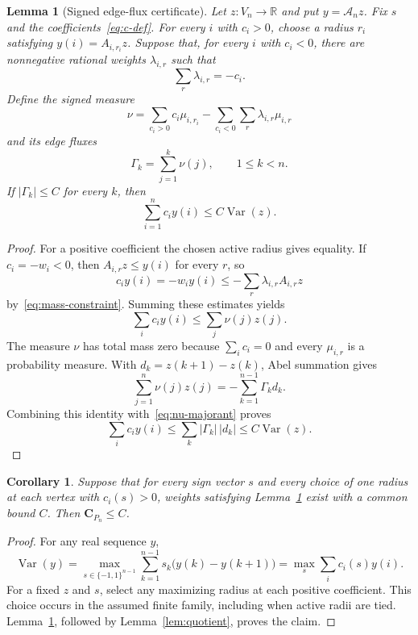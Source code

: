 \documentclass[11pt]{amsart}
\newtheorem{lemma}[theorem]{Lemma}
\newtheorem{corollary}[theorem]{Corollary}
\theoremstyle{definition}
\DeclareMathOperator{\Var}{Var}
\newcommand{\Cpath}[1]{\mathbf C_{P_{#1}}}
\begin{document}
\begin{lemma}[Signed edge-flux certificate]\label{lem:certificate}
Let $z:V_n\to\mathbb R$ and put $y=\mathcal A_nz$.  Fix $s$ and the
coefficients~\eqref{eq:c-def}.  For every $i$ with $c_i>0$, choose a radius
$r_i$ satisfying $y(i)=A_{i,r_i}z$.  Suppose that, for every $i$ with
$c_i<0$, there are nonnegative rational weights $\lambda_{i,r}$ such that
\begin{equation}\label{eq:mass-constraint}
  \sum_r\lambda_{i,r}=-c_i.
\end{equation}
Define the signed measure
\begin{equation}\label{eq:nu-def}
  \nu=
  \sum_{c_i>0}c_i\mu_{i,r_i}
  -\sum_{c_i<0}\sum_r\lambda_{i,r}\mu_{i,r}
\end{equation}
and its edge fluxes
\[
  \Gamma_k=\sum_{j=1}^k\nu(j),\qquad 1\leq k<n.
\]
If $|\Gamma_k|\leq C$ for every $k$, then
\begin{equation}\label{eq:chamber-bound}
  \sum_{i=1}^n c_i y(i)\leq C\Var(z).
\end{equation}
\end{lemma}

\begin{proof}
For a positive coefficient the chosen active radius gives equality.  If
$c_i=-w_i<0$, then $A_{i,r}z\leq y(i)$ for every $r$, so
\[
  c_i y(i)=-w_i y(i)
  \leq-\sum_r\lambda_{i,r}A_{i,r}z
\]
by~\eqref{eq:mass-constraint}.  Summing these estimates yields
\begin{equation}\label{eq:nu-majorant}
  \sum_i c_i y(i)\leq\sum_j\nu(j)z(j).
\end{equation}
The measure $\nu$ has total mass zero because $\sum_i c_i=0$ and every
$\mu_{i,r}$ is a probability measure.  With
$d_k=z(k+1)-z(k)$, Abel summation gives
\[
  \sum_{j=1}^n\nu(j)z(j)
  =-\sum_{k=1}^{n-1}\Gamma_kd_k.
\]
Combining this identity with~\eqref{eq:nu-majorant} proves
\[
  \sum_i c_i y(i)
  \leq\sum_k|\Gamma_k|\,|d_k|
  \leq C\Var(z).
\]
\end{proof}

\begin{corollary}\label{cor:finite-reduction}
Suppose that for every sign vector $s$ and every choice of one radius at each
vertex with $c_i(s)>0$, weights satisfying Lemma~\ref{lem:certificate} exist
with a common bound $C$.  Then $\Cpath n\leq C$.
\end{corollary}

\begin{proof}
For any real sequence $y$,
\[
  \Var(y)=\max_{s\in\{-1,1\}^{n-1}}
  \sum_{k=1}^{n-1}s_k\bigl(y(k)-y(k+1)\bigr)
  =\max_s\sum_i c_i(s)y(i).
\]
For a fixed $z$ and $s$, select any maximizing radius at each positive
coefficient.  This choice occurs in the assumed finite family, including
when active radii are tied.  Lemma~\ref{lem:certificate}, followed by
Lemma~\ref{lem:quotient}, proves the claim.
\end{proof}
\end{document}
